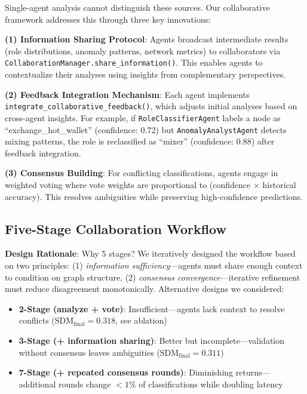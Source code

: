 \documentclass[conference]{IEEEtran}
\begin{document}
Single-agent analysis cannot distinguish these sources. Our collaborative framework addresses this through three key innovations:

\textbf{(1) Information Sharing Protocol}: Agents broadcast intermediate results (role distributions, anomaly patterns, network metrics) to collaborators via \texttt{CollaborationManager.share\_information()}. This enables agents to contextualize their analyses using insights from complementary perspectives.

\textbf{(2) Feedback Integration Mechanism}: Each agent implements \texttt{integrate\_collaborative\_feedback()}, which adjusts initial analyses based on cross-agent insights. For example, if \texttt{RoleClassifierAgent} labels a node as ``exchange\_hot\_wallet'' (confidence: 0.72) but \texttt{AnomalyAnalystAgent} detects mixing patterns, the role is reclassified as ``mixer'' (confidence: 0.88) after feedback integration.

\textbf{(3) Consensus Building}: For conflicting classifications, agents engage in weighted voting where vote weights are proportional to (confidence $\times$ historical accuracy). This resolves ambiguities while preserving high-confidence predictions.

\subsection{Five-Stage Collaboration Workflow}

\textbf{Design Rationale}: Why 5 stages? We iteratively designed the workflow based on two principles: (1) \textit{information sufficiency}—agents must share enough context to condition on graph structure, (2) \textit{consensus convergence}—iterative refinement must reduce disagreement monotonically. Alternative designs we considered:
\begin{itemize}
    \item \textbf{2-Stage (analyze + vote)}: Insufficient—agents lack context to resolve conflicts ($\text{SDM}_{\text{final}} = 0.318$, see ablation)
    \item \textbf{3-Stage (+ information sharing)}: Better but incomplete—validation without consensus leaves ambiguities ($\text{SDM}_{\text{final}} = 0.311$)
    \item \textbf{7-Stage (+ repeated consensus rounds)}: Diminishing returns—additional rounds change $<1\%$ of classifications while doubling latency
\end{itemize}
\end{document}
